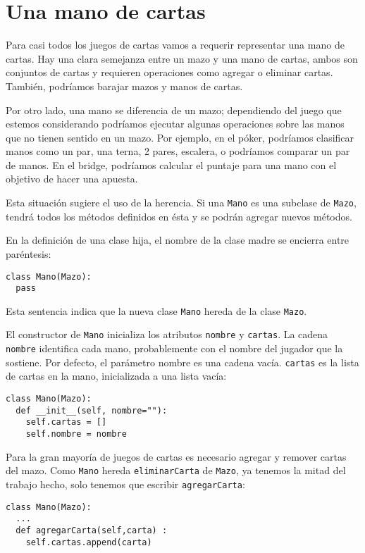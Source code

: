 \section{Una mano de cartas}

Para casi todos los juegos de cartas vamos a requerir representar
una mano de cartas. Hay una clara semejanza entre un mazo y una mano
de cartas, ambos son conjuntos de cartas y requieren operaciones como
agregar o eliminar cartas. También, podríamos barajar mazos y manos
de cartas.

Por otro lado, una mano se diferencia de un mazo; dependiendo del
juego que estemos considerando podríamos ejecutar algunas operaciones
sobre las manos que no tienen sentido en un mazo. Por ejemplo, en
el póker, podríamos clasificar manos como un par, una terna, 2 pares,
escalera, o podríamos comparar un par de manos. En el bridge, podríamos
calcular el puntaje para una mano con el objetivo de hacer una apuesta.

Esta situación sugiere el uso de la herencia. Si una \texttt{Mano}
es una subclase de \texttt{Mazo}, tendrá todos los métodos definidos
en ésta y se podrán agregar nuevos métodos.

 

En la definición de una clase hija, el nombre de la clase madre se
encierra entre paréntesis:

\begin{verbatim}
class Mano(Mazo):
  pass
\end{verbatim}
 Esta sentencia indica que la nueva clase \texttt{Mano} hereda de
la clase \texttt{Mazo}.

El constructor de \texttt{Mano} inicializa los atributos \texttt{nombre}
y \texttt{cartas}. La cadena \texttt{nombre} identifica cada mano,
probablemente con el nombre del jugador que la sostiene. Por defecto,
el parámetro nombre es una cadena vacía. \texttt{cartas} es la lista
de cartas en la mano, inicializada a una lista vacía:

\begin{verbatim}
class Mano(Mazo):
  def __init__(self, nombre=""):
    self.cartas = []
    self.nombre = nombre
\end{verbatim}
 Para la gran mayoría de juegos de cartas es necesario agregar y remover
cartas del mazo. Como \texttt{Mano} hereda \texttt{eliminarCarta}
de \texttt{Mazo}, ya tenemos la mitad del trabajo hecho, solo tenemos
que escribir \texttt{agregarCarta}:
\begin{verbatim}
class Mano(Mazo):
  ...
  def agregarCarta(self,carta) :
    self.cartas.append(carta)
\end{verbatim}

